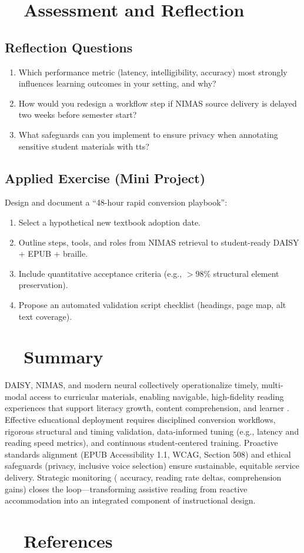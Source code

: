\section{~~Assessment and Reflection}\label{ch07:sec:assessment-reflection}
\subsection*{Reflection Questions}
\begin{enumerate}
	\item Which performance metric (latency, intelligibility,  accuracy) most strongly influences learning
	      outcomes in your setting, and why?
	\item How would you redesign a workflow step if NIMAS source delivery is delayed two weeks before semester start?
	\item What safeguards can you implement to ensure privacy when annotating sensitive student materials with \gls{tts}?
\end{enumerate}

\subsection*{Applied Exercise (Mini Project)}
Design and document a “48-hour rapid conversion playbook”:
\begin{enumerate}
	\item Select a hypothetical new textbook adoption date.
	\item Outline steps, tools, and roles from NIMAS retrieval to student-ready DAISY + EPUB + braille.
	\item Include quantitative acceptance criteria (e.g., $> 98\%$ structural element preservation).
	\item Propose an automated validation script checklist (headings, page map, alt text coverage).
\end{enumerate}

\section{~~Summary}\label{ch07:sec:summary}
DAISY, NIMAS, and modern neural  collectively operationalize timely, multi-modal access
to curricular materials, enabling navigable, high-fidelity reading experiences that support literacy growth,
content comprehension, and learner . Effective educational deployment requires disciplined
conversion workflows, rigorous structural and timing validation, data-informed tuning (e.g., latency and
reading speed metrics), and continuous student-centered training. Proactive standards alignment (EPUB
Accessibility 1.1, WCAG, Section 508) and ethical safeguards (privacy, inclusive voice selection) ensure
sustainable, equitable service delivery. Strategic monitoring ( accuracy, reading rate deltas,
comprehension gains) closes the loop—transforming assistive reading from reactive accommodation into
an integrated component of instructional design.

\section{~~References}\label{ch07:sec:references}

\endinput

